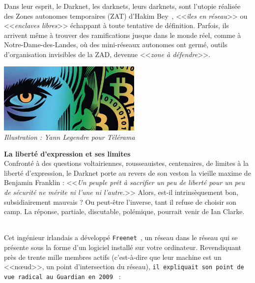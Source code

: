 \documentclass[11pt,twoside,a4paper]{article}
\begin{document}
Dans leur esprit, le Darknet, les darknets, leurs darknets, sont l'utopie r{\'e}alis{\'e}e des Zones autonomes temporaires (ZAT) d'Hakim Bey~\footnotemark , <<\emph{{\^i}les en r{\'e}seau}>> ou <<\emph{enclaves libres}>> {\'e}chappant {\`a} toute tentative de d{\'e}finition. Parfois, ils arrivent m{\^e}me {\`a} trouver des ramifications jusque dans le monde r{\'e}el, comme {\`a} Notre-Dame-des-Landes, o{\`u} des mini-r{\'e}seaux autonomes ont germ{\'e}, outils d'organisation invisibles de la ZAD, devenue <<\emph{zone {\`a} d{\'e}fendre}>>. ~\\

\begin{minipage}[ht]{7.25cm}
	\includegraphics[width=7.00cm]{img/darknet-immersion-en-reseaux-troubles,M124682.jpg}~\\
	\emph{Illustration : Yann Legendre pour T{\'e}l{\'e}rama }~\\
\end{minipage} \hfill \begin{minipage}[ht]{12.00cm}
	\textbf{\large La libert{\'e} d'expression et ses limites}~\\

	Confront{\'e} {\`a} des questions voltairiennes, rousseauistes, centenaires, de limites {\`a} la libert{\'e} d'expression, le Darknet porte au revers de son veston la vieille maxime de Benjamin Franklin : <<\emph{Un peuple pr{\^e}t {\`a} sacrifier un peu de libert{\'e} pour un peu de s{\'e}curit{\'e} ne m{\'e}rite ni l'une ni l'autre.}>> Alors, est-il intrins{\`e}quement bon, subsidiairement mauvais ? Ou peut-{\^e}tre l'inverse, tant il refuse de choisir son camp. La r{\'e}ponse, partiale, discutable, pol{\'e}mique, pourrait venir de Ian Clarke. ~\\
\end{minipage}~\\

Cet ing{\'e}nieur irlandais a d{\'e}velopp{\'e} \texttt{Freenet~\footnotemark }, un r{\'e}seau dans le r{\'e}seau qui se pr{\'e}sente sous la forme d'un logiciel install{\'e} sur votre ordinateur. Revendiquant pr{\`e}s de trente mille membres actifs (c'est-{\`a}-dire que leur machine est un <<nœud>>, un point d'intersection du r{\'e}seau), \texttt{il expliquait son point de vue radical au Guardian en 2009~\footnotemark } : ~\\
\end{document}
